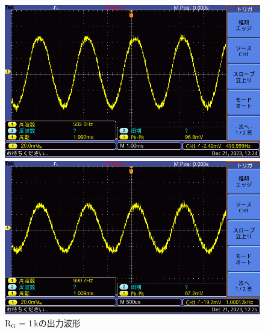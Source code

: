\documentclass{ltjsarticle}
\begin{document}
\begin{figure}[H]
\begin{minipage}{0.4\columnwidth}
			\end{minipage}
			\hspace{0.04\columnwidth}
			\begin{minipage}{0.4\columnwidth}
			\centering
			\includegraphics[width = \columnwidth]{figs/F0019TEK.PNG}
			\end{minipage}
			\hspace{0.04\columnwidth}
			\begin{minipage}{0.4\columnwidth}
			\centering
			\includegraphics[width = \columnwidth]{figs/F0020TEK.PNG}
			\end{minipage}
			\caption{$\mathrm{R_G}$ = 1\,k\Omega の出力波形}
			\label{fig:week5-1-1k}
			\end{figure}
\end{document}

